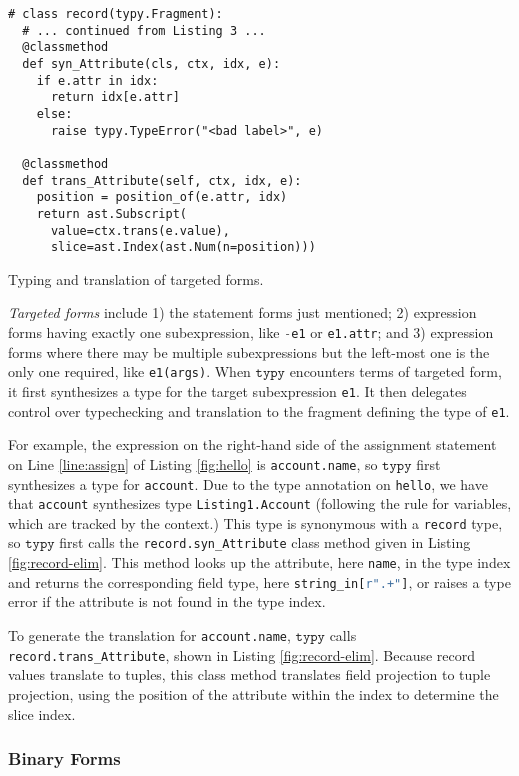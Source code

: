 \documentclass[preprint,10pt]{sigplanconf}
\newcommand{\typy}{\texttt{typy}}
\newcommand{\lip}[1]{\lstinline[language=Python,basicstyle=\ttfamily\footnotesize,deletendkeywords={tuple,buffer,map}]{#1}}
\newcommand{\li}[1]{\lip{#1}}
\begin{document}
\begin{codelisting}[t]
\vspace{-3px}
\begin{lstlisting}
# class record(typy.Fragment): 
  # ... continued from Listing 3 ...
  @classmethod
  def syn_Attribute(cls, ctx, idx, e):
    if e.attr in idx:
      return idx[e.attr]
    else:
      raise typy.TypeError("<bad label>", e)

  @classmethod
  def trans_Attribute(self, ctx, idx, e): 
    position = position_of(e.attr, idx)
    return ast.Subscript(
      value=ctx.trans(e.value),
      slice=ast.Index(ast.Num(n=position)))
\end{lstlisting}
\caption{Typing and translation of targeted forms.}
\label{fig:record-elim}
\end{codelisting}
\emph{Targeted forms} include 1) the statement forms just mentioned; 2) expression forms having exactly one subexpression, like \lip{-e1} or \lip{e1.attr}; and 3) expression forms where there may be multiple subexpressions but the left-most one is the only one required, like \lip{e1(args)}. When $\typy$ encounters terms of targeted form, it first synthesizes a type for the target subexpression \li{e1}. It then delegates control over typechecking and translation to the fragment defining the type of \li{e1}.

For example, the expression on the right-hand side of the assignment statement on Line \ref{line:assign} of Listing \ref{fig:hello} is \li{account.name}, so $\typy$ first synthesizes a type for \li{account}. Due to the type annotation on \li{hello}, we have that \li{account} synthesizes type \li{Listing1.Account} (following the rule for variables, which are tracked by the context.) This type is synonymous with a \li{record} type, so $\typy$ first calls the \li{record.syn_Attribute} class method given in Listing \ref{fig:record-elim}. This method looks up the attribute, here \li{name}, in the type index and returns the corresponding field type, here \li{string_in[r".+"]}, or raises a type error if the attribute is not found in the type index.



To generate the translation for \li{account.name}, $\typy$ calls \li{record.trans_Attribute}, shown in Listing \ref{fig:record-elim}. Because record values translate to tuples, this class method translates field projection to tuple projection, using the position of the attribute within the index to determine the slice index.

\vspace{-3px}\subsubsection{Binary Forms}\label{sec:binary-forms}
\end{document}

